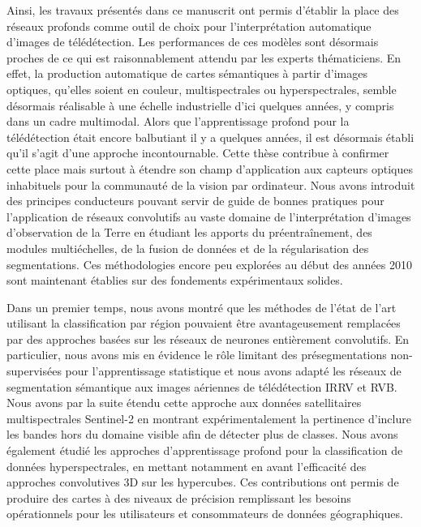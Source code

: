 Ainsi, les travaux présentés dans ce manuscrit ont permis d'établir la place des réseaux profonds comme outil de choix pour l'interprétation automatique d'images de télédétection. Les performances de ces modèles sont désormais proches de ce qui est raisonnablement attendu par les experts thématiciens. En effet, la production automatique de cartes sémantiques à partir d'images optiques, qu'elles soient en couleur, multispectrales ou hyperspectrales, semble désormais réalisable à une échelle industrielle d'ici quelques années, y compris dans un cadre multimodal. Alors que l'apprentissage profond pour la télédétection était encore balbutiant il y a quelques années, il est désormais établi qu'il s'agit d'une approche incontournable. Cette thèse contribue à confirmer cette place mais surtout à étendre son champ d'application aux capteurs optiques inhabituels pour la communauté de la vision par ordinateur. Nous avons introduit des principes conducteurs pouvant servir de guide de bonnes pratiques pour l'application de réseaux convolutifs au vaste domaine de l'interprétation d'images d'observation de la Terre en étudiant les apports du préentraînement, des modules multiéchelles, de la fusion de données et de la régularisation des segmentations. Ces méthodologies encore peu explorées au début des années 2010 sont maintenant établies sur des fondements expérimentaux solides.

Dans un premier temps, nous avons montré que les méthodes de l'état de l'art utilisant la classification par région pouvaient être avantageusement remplacées par des approches basées sur les réseaux de neurones entièrement convolutifs. En particulier, nous avons mis en évidence le rôle limitant des présegmentations non-supervisées pour l'apprentissage statistique et nous avons adapté les réseaux de segmentation sémantique aux images aériennes de télédétection \gls{IRRV} et \gls{RVB}. Nous avons par la suite étendu cette approche aux données satellitaires multispectrales \gls{Sentinel}-2 en montrant expérimentalement la pertinence d'inclure les bandes hors du domaine visible afin de détecter plus de classes. Nous avons également étudié les approches d'apprentissage profond pour la classification de données hyperspectrales, en mettant notamment en avant l'efficacité des approches convolutives 3D sur les hypercubes. Ces contributions ont permis de produire des cartes à des niveaux de précision remplissant les besoins opérationnels pour les utilisateurs et consommateurs de données géographiques.


